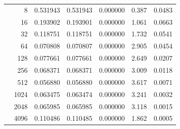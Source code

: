 \documentclass[a4paper,11pt]{article}
\begin{document}
\begin{center}
\begin{longtable}{crccccc}
                       & 8    & 0.531943 & 0.531943 & 0.000000 & 0.387  & 0.0483 \\
                       & 16   & 0.193902 & 0.193901 & 0.000000 & 1.061  & 0.0663 \\
                       & 32   & 0.118751 & 0.118751 & 0.000000 & 1.732  & 0.0541 \\
                       & 64   & 0.070808 & 0.070807 & 0.000000 & 2.905  & 0.0454 \\
                       & 128  & 0.077661 & 0.077661 & 0.000000 & 2.649  & 0.0207 \\
                       & 256  & 0.068371 & 0.068371 & 0.000000 & 3.009  & 0.0118 \\
                       & 512  & 0.056880 & 0.056880 & 0.000000 & 3.617  & 0.0071 \\
                       & 1024 & 0.063475 & 0.063474 & 0.000000 & 3.241  & 0.0032 \\
                       & 2048 & 0.065985 & 0.065985 & 0.000000 & 3.118  & 0.0015 \\
                       & 4096 & 0.110486 & 0.110485 & 0.000000 & 1.862  & 0.0005 \\
\end{longtable}
\end{center}

\newpage
\end{document}
